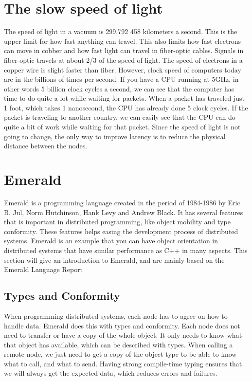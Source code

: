 \section{The slow speed of light}
The speed of light in a vacuum is 299,792 458 kilometers a second. This is the upper limit for how fast anything can travel. This also limits how fast electrons can move in cobber and how fast light can travel in fiber-optic cables. Signals in fiber-optic travels at about 2/3 of the speed of light. The speed of electrons in a copper wire is slight faster than fiber. However, clock speed of computers today are in the billions of times per second. If you have a CPU running at 5GHz, in other words 5 billion clock cycles a second, we can see that the computer has time to do quite a lot while waiting for packets. When a packet has traveled just 1 foot, which takes 1 nanosecond, the CPU has already done 5 clock cycles. If the packet is traveling to another country, we can easily see that the CPU can do quite a bit of work while waiting for that packet. Since the speed of light is not going to change, the only way to improve latency is to reduce the physical distance between the nodes.











\section{Emerald}\label{Emerald}
Emerald is a programming language created in the period of 1984-1986 by Eric B. Jul, Norm Hutchinson, Hank Levy and Andrew Black. It has several features that is important in distributed programming, like object mobility and type conformity. These features helps easing the development process of distributed systems. Emerald is an example that you can have object orientation in distributed systems that have similar performance as C++ in many aspects. This section will give an introduction to Emerald, and are mainly based on the Emerald Language Report\cite{hutchinson_emerald_nodate}

\subsection{Types and Conformity}
When programming distributed systems, each node has to agree on how to handle data. Emerald does this with types and conformity. Each node does not need to transfer or have a copy of the whole object. It only needs to know what that object has available, which can be described with types. When calling a remote node, we just need to get a copy of the object type to be able to know what to call, and what to send. Having strong compile-time typing ensures that we will always get the expected data, which reduces errors and failures.

